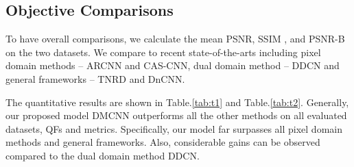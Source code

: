 \documentclass{article}
\begin{document}
\subsection{Objective Comparisons}
\vspace{-0.2cm}
\label{ssec:bsds500}
To have overall comparisons, we calculate the mean PSNR,
SSIM \cite{wang2004image}, and PSNR-B \cite{yim2011quality} on the
two datasets. We compare to recent state-of-the-arts including
pixel domain methods -- ARCNN and CAS-CNN, dual domain method
-- DDCN and general frameworks -- TNRD \cite{chen2017trainable}
and DnCNN\cite{zhang2017beyond}.

The quantitative results are shown in Table.\ref{tab:t1} and
Table.\ref{tab:t2}. Generally, our
proposed model DMCNN outperforms all the other methods on all evaluated
datasets, QFs and metrics. Specifically, our model far surpasses all
pixel domain methods and general frameworks. Also, considerable gains
can be observed compared to the dual domain method DDCN.
\end{document}

